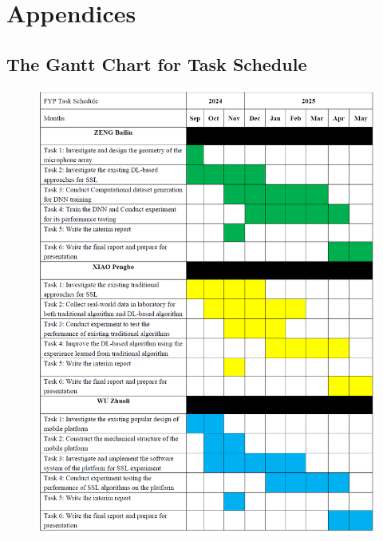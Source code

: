 \chapter*{Appendices}

\section*{The Gantt Chart for Task Schedule}
\begin{figure}[H]
    \centering
    \includegraphics[width=1\linewidth]{figures/Gantt_chart.png}
\end{figure}

